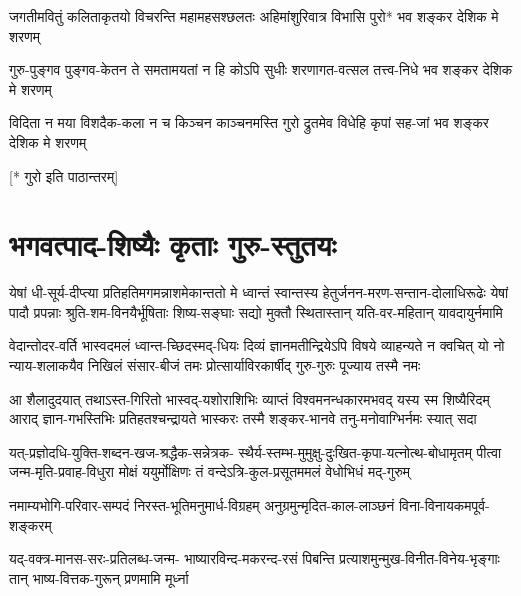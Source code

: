 \twolineshloka
{जगतीमवितुं कलिताकृतयो विचरन्ति महामहसश्छलतः}
{अहिमांशुरिवात्र विभासि पुरो* भव शङ्कर देशिक मे शरणम्}

\twolineshloka
{गुरु-पुङ्गव पुङ्गव-केतन ते समतामयतां न हि कोऽपि सुधीः}
{शरणागत-वत्सल तत्त्व-निधे भव शङ्कर देशिक मे शरणम्}

\twolineshloka
{विदिता न मया विशदैक-कला न च किञ्चन काञ्चनमस्ति गुरो}
{द्रुतमेव विधेहि कृपां सह-जां भव शङ्कर देशिक मे शरणम्}

{\normalsize[* गुरो इति पाठान्तरम्]}


\section{भगवत्पाद-शिष्यैः कृताः गुरु-स्तुतयः}

\fourlineindentedshloka
{येषां धी-सूर्य-दीप्त्या प्रतिहतिमगमन्नाशमेकान्ततो मे}
{ध्वान्तं स्वान्तस्य हेतुर्जनन-मरण-सन्तान-दोलाधिरूढेः}
{येषां पादौ प्रपन्नाः श्रुति-शम-विनयैर्भूषिताः शिष्य-सङ्घाः}
{सद्यो मुक्तौ स्थितास्तान् यति-वर-महितान् यावदायुर्नमामि}


\fourlineindentedshloka
{वेदान्तोदर-वर्ति भास्वदमलं ध्वान्त-च्छिदस्मद्-धियः}
{दिव्यं ज्ञानमतीन्द्रियेऽपि विषये व्याहन्यते न क्वचित्}
{यो नो न्याय-शलाकयैव निखिलं संसार-बीजं तमः}
{प्रोत्सार्याविरकार्षीद् गुरु-गुरुः पूज्याय तस्मै नमः}


\fourlineindentedshloka
{आ शैलादुदयात् तथाऽस्त-गिरितो भास्वद्-यशोराशिभिः}
{व्याप्तं विश्वमनन्धकारमभवद् यस्य स्म शिष्यैरिदम्}
{आराद् ज्ञान-गभस्तिभिः प्रतिहतश्चन्द्रायते भास्करः}
{तस्मै शङ्कर-भानवे तनु-मनोवाग्भिर्नमः स्यात् सदा}

\fourlineindentedshloka
{यत्-प्रज्ञोदधि-युक्ति-शब्दन-खज-श्रद्धैक-सन्नेत्रक-}
{स्थैर्य-स्तम्भ-मुमुक्षु-दुःखित-कृपा-यत्नोत्थ-बोधामृतम्}
{पीत्वा जन्म-मृति-प्रवाह-विधुरा मोक्षं ययुर्मोक्षिणः}
{तं वन्देऽत्रि-कुल-प्रसूतममलं वेधोभिधं मद्-गुरुम्}


\twolineshloka
{नमाम्यभोगि-परिवार-सम्पदं निरस्त-भूतिमनुमार्ध-विग्रहम्}
{अनुग्रमुन्मृदित-काल-लाञ्छनं विना-विनायकमपूर्व-शङ्करम्}

\fourlineindentedshloka
{यद्-वक्त्र-मानस-सरः-प्रतिलब्ध-जन्म-}
{भाष्यारविन्द-मकरन्द-रसं पिबन्ति}
{प्रत्याशमुन्मुख-विनीत-विनेय-भृङ्गाः}
{तान् भाष्य-वित्तक-गुरून् प्रणमामि मूर्ध्ना}

